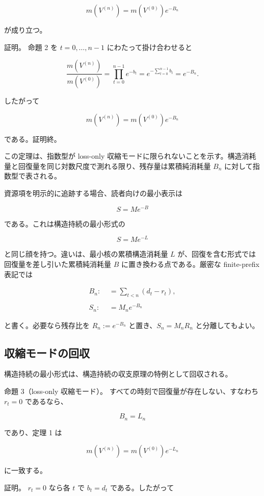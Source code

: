 \documentclass[12pt,a4paper]{article}
\begin{document}
\[
m(V^{(n)}) = m(V^{(0)}) e^{-B_{n}}
\]

が成り立つ。

証明。 命題 2 を \(t=0,\ldots,n-1\) にわたって掛け合わせると

\[
\frac{m(V^{(n)})}{m(V^{(0)})} = \prod_{t=0}^{n-1} e^{-b_{t}} = e^{-\sum_{t=0}^{n-1} b_{t}} = e^{-B_{n}}.
\]

したがって

\[
m(V^{(n)}) = m(V^{(0)}) e^{-B_{n}}
\]

である。証明終。

この定理は、指数型が loss-only 収縮モードに限られないことを示す。構造消耗量と回復量を同じ対数尺度で測れる限り、残存量は累積純消耗量 \(B_{n}\) に対して指数型で表される。

資源項を明示的に追跡する場合、読者向けの最小表示は

\[
S = M e^{-B}
\]

である。これは構造持続の最小形式の

\[
S = M e^{-L}
\]

と同じ顔を持つ。違いは、最小核の累積構造消耗量 \(L\) が、回復を含む形式では回復量を差し引いた累積純消耗量 \(B\) に置き換わる点である。厳密な finite-prefix 表記では

\[
\begin{aligned}
B_{n} :&= \sum_{t<n}(d_{t}-r_{t}), \\
\qquad \\
S_{n} :&= M_{n} e^{-B_{n}}
\end{aligned}
\]

と書く。必要なら残存比を \(R_{n}:=e^{-B_{n}}\) と置き、\(S_{n}=M_{n} R_{n}\) と分離してもよい。

\subsection{収縮モードの回収}\label{ux53ceux7e2eux30e2ux30fcux30c9ux306eux56deux53ce}

構造持続の最小形式は、構造持続の収支原理の特例として回収される。

命題 3（loss-only 収縮モード）。 すべての時刻で回復量が存在しない、すなわち \(r_{t}=0\) であるなら、

\[
B_{n} = L_{n}
\]

であり、定理 1 は

\[
m(V^{(n)}) = m(V^{(0)}) e^{-L_{n}}
\]

に一致する。

証明。 \(r_{t}=0\) なら各 \(t\) で \(b_{t}=d_{t}\) である。したがって
\end{document}
